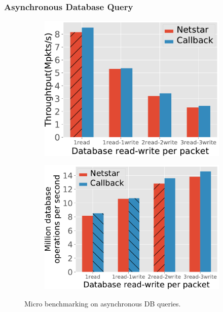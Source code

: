 
\subsubsection{Asynchronous Database Query}
\label{microbenchmark_db}

\begin{figure}[!h]
  \begin{subfigure}[t]{0.49\linewidth}
    \centering
    \includegraphics[width=\columnwidth]{chap-netstar/figure_src/read_write_throughput.pdf}
    \caption{}\label{fig:eval2.1}
  \end{subfigure}\hfill
  \begin{subfigure}[t]{0.49\linewidth}
    \centering
    \includegraphics[width=\columnwidth]{chap-netstar/figure_src/read_write_speed.pdf}
    \caption{}\label{fig:eval2.2}
  \end{subfigure}
\caption{Micro benchmarking on asynchronous DB queries.}
\label{fig:eval2}
\end{figure}

